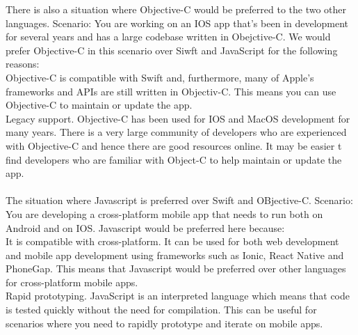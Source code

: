 \documentclass[a4paper, 11pt]{report}
\begin{document}
There is also a situation where Objective-C would be preferred to the two other languages. Scenario: You are working on an IOS app that’s been in development for several years and has a large codebase written in Obejctive-C. We would prefer Objective-C in this scenario over Siwft and JavaScript for the following reasons:\\
Objective-C is compatible with Swift and, furthermore, many of Apple’s frameworks and APIs are still written in Objectiv-C. This means you can use Objective-C to maintain or update the app.\\
Legacy support. Objective-C has been used for IOS and MacOS development for many years. There is a very large community of developers who are experienced with Objective-C and hence there are good resources online.  It may be easier t find developers who are familiar with Object-C to help maintain or update the app.\\
\\
The situation where Javascript is preferred over Swift and OBjective-C. Scenario: You are developing a cross-platform mobile app that needs to run both on Android and on IOS. Javascript would be preferred here because:\\
It is compatible with cross-platform. It can be used for both web development and mobile app development using frameworks such as Ionic, React Native and PhoneGap. This means that Javascript would be preferred over other languages for cross-platform mobile apps.\\
Rapid prototyping. JavaScript is an interpreted language which means that code is tested quickly without the need for compilation. This can be useful for scenarios where you need to rapidly prototype and iterate on mobile apps.






\newpage



\end{document}
